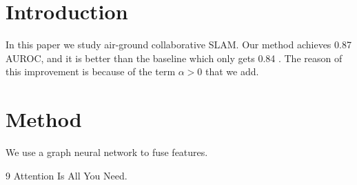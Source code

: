 \documentclass{article}
\begin{document}
\section{Introduction}
In this paper we study air-ground collaborative SLAM. Our method achieves 0.87
AUROC, and it is better than the baseline which only gets 0.84 \cite{vaswani2017}.
The reason of this improvement is because of the term $\alpha > 0$ that we add.

\section{Method}
We use a graph neural network to fuse features.

\begin{thebibliography}{9}
 Attention Is All You Need.
\end{thebibliography}
\end{document}

